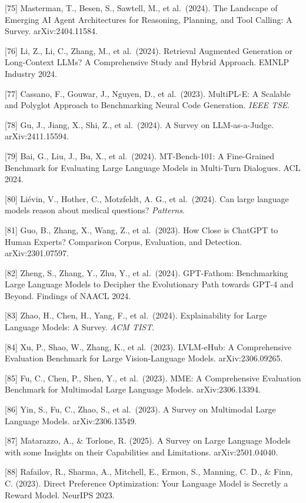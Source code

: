 {[}75{]} Masterman, T., Besen, S., Sawtell, M., et al.~(2024). The Landscape of Emerging AI Agent Architectures for Reasoning, Planning, and Tool Calling: A Survey. arXiv:2404.11584.

{[}76{]} Li, Z., Li, C., Zhang, M., et al.~(2024). Retrieval Augmented Generation or Long-Context LLMs? A Comprehensive Study and Hybrid Approach. EMNLP Industry 2024.

{[}77{]} Cassano, F., Gouwar, J., Nguyen, D., et al.~(2023). MultiPL-E: A Scalable and Polyglot Approach to Benchmarking Neural Code Generation. \emph{IEEE TSE}.

{[}78{]} Gu, J., Jiang, X., Shi, Z., et al.~(2024). A Survey on LLM-as-a-Judge. arXiv:2411.15594.

{[}79{]} Bai, G., Liu, J., Bu, X., et al.~(2024). MT-Bench-101: A Fine-Grained Benchmark for Evaluating Large Language Models in Multi-Turn Dialogues. ACL 2024.

{[}80{]} Liévin, V., Hother, C., Motzfeldt, A. G., et al.~(2024). Can large language models reason about medical questions? \emph{Patterns}.

{[}81{]} Guo, B., Zhang, X., Wang, Z., et al.~(2023). How Close is ChatGPT to Human Experts? Comparison Corpus, Evaluation, and Detection. arXiv:2301.07597.

{[}82{]} Zheng, S., Zhang, Y., Zhu, Y., et al.~(2024). GPT-Fathom: Benchmarking Large Language Models to Decipher the Evolutionary Path towards GPT-4 and Beyond. Findings of NAACL 2024.

{[}83{]} Zhao, H., Chen, H., Yang, F., et al.~(2024). Explainability for Large Language Models: A Survey. \emph{ACM TIST}.

{[}84{]} Xu, P., Shao, W., Zhang, K., et al.~(2023). LVLM-eHub: A Comprehensive Evaluation Benchmark for Large Vision-Language Models. arXiv:2306.09265.

{[}85{]} Fu, C., Chen, P., Shen, Y., et al.~(2023). MME: A Comprehensive Evaluation Benchmark for Multimodal Large Language Models. arXiv:2306.13394.

{[}86{]} Yin, S., Fu, C., Zhao, S., et al.~(2023). A Survey on Multimodal Large Language Models. arXiv:2306.13549.

{[}87{]} Matarazzo, A., \& Torlone, R. (2025). A Survey on Large Language Models with some Insights on their Capabilities and Limitations. arXiv:2501.04040.

{[}88{]} Rafailov, R., Sharma, A., Mitchell, E., Ermon, S., Manning, C. D., \& Finn, C. (2023). Direct Preference Optimization: Your Language Model is Secretly a Reward Model. NeurIPS 2023.

